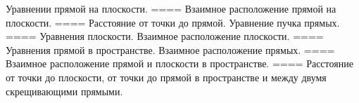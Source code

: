 Уравнении прямой на плоскости.
====
Взаимное расположение прямой на плоскости.
====
Расстояние от точки до прямой. Уравнение пучка прямых.
====
Уравнения плоскости. Взаимное расположение плоскости.
====
Уравнения прямой в пространстве. Взаимное расположение прямых.
====
Взаимное расположение прямой и плоскости в пространстве.
====
Расстояние от точки до плоскости, от точки до прямой в пространстве и между двумя скрещивающими прямыми.